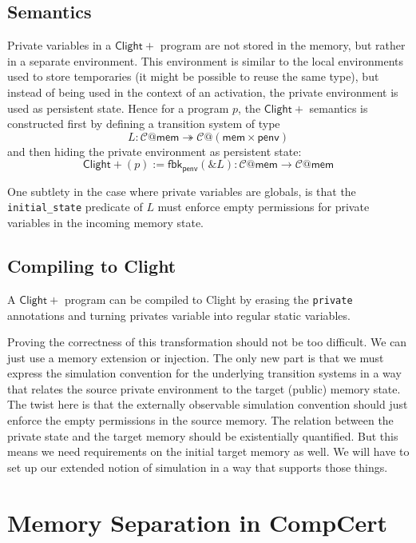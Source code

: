 \documentclass[acmsmall,screen,review,anonymous]{acmart}
\newcommand{\ClightP}{\ensuremath{\mathsf{Clight+}}}
\begin{document}
\subsection{Semantics}

Private variables in a \ClightP{} program
are not stored in the memory,
but rather in a separate environment.
This environment is similar to
the local environments used to store temporaries
(it might be possible to reuse the same type),
but instead of being used in the context of an activation,
the private environment is used as persistent state.
Hence for a program $p$, the \ClightP{} semantics is constructed
first by defining a transition system of type
\[
  L : \mathcal{C}@\mathsf{mem} \twoheadrightarrow
      \mathcal{C}@(\mathsf{mem}\times\mathsf{penv})
\]
and then hiding the private environment as persistent state:
\[
  \ClightP{}(p) := \mathsf{fbk}_\mathsf{penv}(\&L) :
    \mathcal{C}@\mathsf{mem} \rightarrow
    \mathcal{C}@\mathsf{mem}
\]

One subtlety in the case where private variables are globals,
is that the \texttt{initial\_state} predicate of $L$
must enforce empty permissions for private variables
in the incoming memory state.

\subsection{Compiling to Clight}

A \ClightP{} program can be compiled to Clight
by erasing the \texttt{private} annotations
and turning privates variable into regular
static variables.

Proving the correctness of this transformation
should not be too difficult.
We can just use a memory extension or injection.
The only new part is that we must express
the simulation convention for the underlying transition systems
in a way that relates the source private environment
to the target (public) memory state.
The twist here is that
the externally observable simulation convention
should just enforce the empty permissions in the source memory.
The relation between the private state and the target memory
should be existentially quantified.
But this means we need requirements on the initial target memory as well.
We will have to set up our extended notion of simulation
in a way that supports those things.


\section{Memory Separation in CompCert} %
\end{document}

